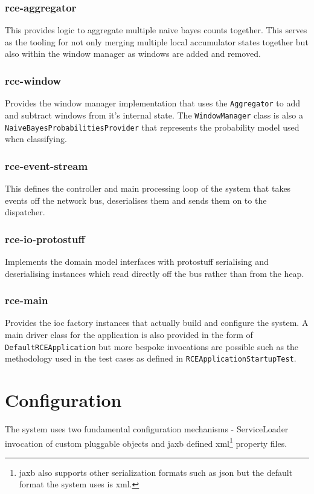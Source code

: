 \documentclass[a4paper,11pt]{scrreprt}
\begin{document}
\subsubsection{rce-aggregator}
This provides logic to aggregate multiple naive bayes counts together. This serves as the tooling for not only merging multiple local accumulator states together but also within the window manager as windows are added and removed.

\subsubsection{rce-window}
Provides the window manager implementation that uses the \verb|Aggregator| to add and subtract windows from it's internal state. The \verb|WindowManager| class is also a\\ \verb|NaiveBayesProbabilitiesProvider| that represents the probability model used when classifying.

\subsubsection{rce-event-stream}
This defines the controller and main processing loop of the system that takes events off the network bus, deserialises them and sends them on to the dispatcher.

\subsubsection{rce-io-protostuff}
Implements the domain model interfaces with protostuff serialising and deserialising instances which read directly off the bus rather than from the heap.

\subsubsection{rce-main}
Provides the \acrshort{ioc} factory instances that actually build and configure the system. A main driver class for the application is also provided in the form of \verb|DefaultRCEApplication| but more bespoke invocations are possible such as the methodology used in the test cases as defined in \verb|RCEApplicationStartupTest|.

\section{Configuration}
The system uses two fundamental configuration mechanisms - ServiceLoader invocation of custom pluggable objects and \acrshort{jaxb} defined \acrshort{xml}\footnote{\acrshort{jaxb} also supports other serialization formats such as \acrshort{json} but the default format the system uses is \acrshort{xml}.} property files.
\end{document}
